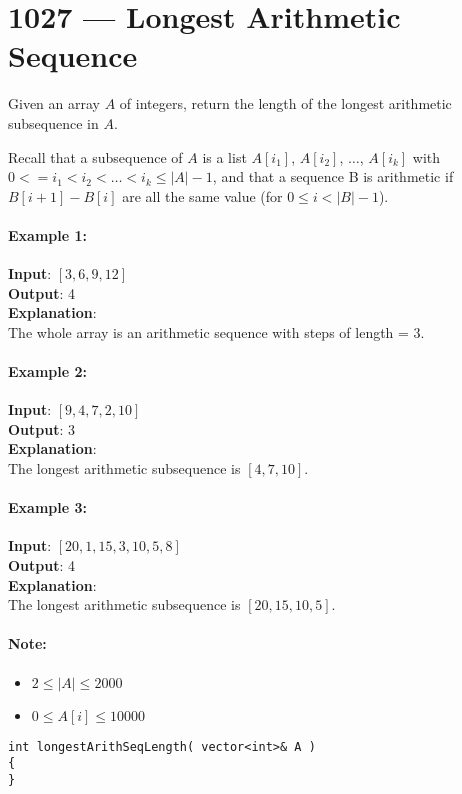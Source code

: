\section{1027 --- Longest Arithmetic Sequence}
Given an array $ A $ of integers, return the length of the longest arithmetic subsequence in $ A $.
\par
Recall that a subsequence of $ A $ is a list $ A[i_1] $, $ A[i_2] $, $ \ldots $, $ A[i_k] $ with $0 <= i_1 < i_2 < \ldots < i_k \leq |A| - 1$, and that a sequence B is arithmetic if $B[i+1] - B[i]$ are all the same value (for $0 \leq i < |B| - 1$).

\paragraph{Example 1:}

\begin{flushleft}
\textbf{Input}: $[3,6,9,12]$
\\
\textbf{Output}: 4
\\
\textbf{Explanation}:
\\ 
The whole array is an arithmetic sequence with steps of length = 3.
\end{flushleft}


\paragraph{Example 2:}

\begin{flushleft}
\textbf{Input}: $[9,4,7,2,10]$
\\
\textbf{Output}: 3
\\
\textbf{Explanation}:
\\
The longest arithmetic subsequence is $[4,7,10]$.
\end{flushleft}

\paragraph{Example 3:}

\begin{flushleft}
\textbf{Input}: $[20,1,15,3,10,5,8]$
\\
\textbf{Output}: 4
\\
\textbf{Explanation}: 
\\
The longest arithmetic subsequence is $[20,15,10,5]$.
\end{flushleft}

\paragraph{Note:}

\begin{itemize}
\item $2 \leq |A| \leq 2000$
\item $0 \leq A[i] \leq 10000$
\end{itemize}

\setcounter{lstlisting}{0}
\begin{lstlisting}[style=customc, caption={TODO}]
int longestArithSeqLength( vector<int>& A )
{
}
\end{lstlisting}